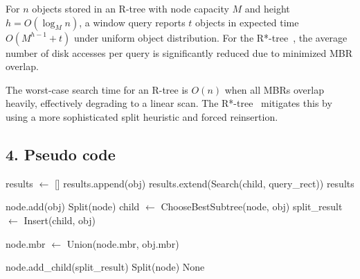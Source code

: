 \begin{theorem}
\label{thm:rt_search}
For $n$ objects stored in an R-tree with node capacity $M$ and height $h = O(\log_M n)$, a window query reports $t$ objects in expected time $O(M^{h-1} + t)$ under uniform object distribution. For the R*-tree~\cite{beckmann1990}, the average number of disk accesses per query is significantly reduced due to minimized MBR overlap.
\end{theorem}

\begin{remark}
The worst-case search time for an R-tree is $O(n)$ when all MBRs overlap heavily, effectively degrading to a linear scan. The R*-tree~\cite{beckmann1990} mitigates this by using a more sophisticated split heuristic and forced reinsertion.
\end{remark}

\subsection{4. Pseudo code}
\begin{algorithm}
\begin{algorithmic}[1]
\label{alg:rt_search}
    \State results $\gets$ []
                \State results.append(obj)
            \EndIf
        \EndFor
    \Else
                \State results.extend(Search(child, query\_rect))
            \EndIf
        \EndFor
    \EndIf
    \State \Return results
\EndFunction

\label{alg:rt_insert}
        \State node.add(obj)
            \State \Return Split(node) 
        \EndIf
    \Else
        \State child $\gets$ ChooseBestSubtree(node, obj)
        \State split\_result $\gets$ Insert(child, obj)
        
        \State node.mbr $\gets$ Union(node.mbr, obj.mbr)
        
            \State node.add\_child(split\_result)
                \State \Return Split(node)
            \EndIf
        \EndIf
    \EndIf
    \State \Return None
\EndFunction
\end{algorithmic}
\end{algorithm}

